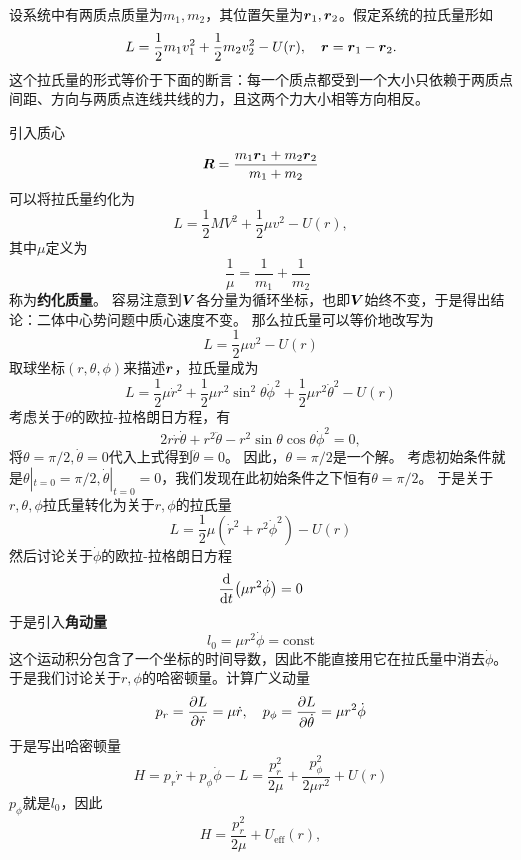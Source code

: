 \documentclass[UTF8, a4paper]{ctexart}
\newcommand*{\const}{\mathrm{const}}
\begin{document}
设系统中有两质点质量为$m_1,m_2$，其位置矢量为$\vb*{r}_1, \vb*{r}_2$。假定系统的拉氏量形如
\begin{equation}
    L = \frac{1}{2} m_1 v_1^2 + \frac{1}{2} m_2 v_2^2 - U(r), \quad \vb*{r} = \vb*{r}_1 - \vb*{r}_2.
    \label{eq:two-body-original}
\end{equation}
这个拉氏量的形式等价于下面的断言：每一个质点都受到一个大小只依赖于两质点间距、方向与两质点连线共线的力，且这两个力大小相等方向相反。

引入质心
\begin{equation}
    \vb*{R} = \frac{m_1 \vb*{r}_1 + m_2 \vb*{r}_2}{m_1 + m_2}
\end{equation}
可以将拉氏量约化为
\[
    L = \frac{1}{2} M V^2 + \frac{1}{2} \mu v^2 - U(r), 
\]
其中$\mu$定义为
\begin{equation}
    \quad \frac{1}{\mu} = \frac{1}{m_1} + \frac{1}{m_2}
\end{equation}
称为\textbf{约化质量}。
容易注意到$\vb*{V}$各分量为循环坐标，也即$\vb*{V}$始终不变，于是得出结论：二体中心势问题中质心速度不变。
那么拉氏量可以等价地改写为
\[
    L = \frac{1}{2} \mu v^2 - U(r)
\]
取球坐标$(r, \theta, \phi)$来描述$\vb*{r}$，拉氏量成为
\[
    L = \frac{1}{2} \mu \dot{r}^2 + \frac{1}{2} \mu r^2 \sin^2 \theta \dot{\phi}^2 + \frac{1}{2} \mu r^2 \dot{\theta}^2 - U(r)
\]
考虑关于$\theta$的欧拉-拉格朗日方程，有
\[
    2 r \dot{r} \dot{\theta} + r^2 \ddot{\theta} - r^2 \sin \theta \cos \theta \dot{\phi}^2 = 0,
\]
将$\theta=\pi/2, \dot{\theta}=0$代入上式得到$\ddot{\theta}=0$。
因此，$\theta=\pi/2$是一个解。
考虑初始条件就是$\theta|_{t=0}=\pi/2, \dot{\theta}|_{t=0}=0$，我们发现在此初始条件之下恒有$\theta=\pi/2$。
于是关于$r, \theta, \phi$拉氏量转化为关于$r, \phi$的拉氏量
\[
    L = \frac{1}{2} \mu (\dot{r}^2 + r^2 \dot{\phi}^2) - U(r)
\]
然后讨论关于$\dot{\phi}$的欧拉-拉格朗日方程
\[
    \dv{t} (\mu r^2 \dot{\phi}) = 0
\]
于是引入\textbf{角动量}
\begin{equation}
    l_0 = \mu r^2 \dot{\phi} = \const
\end{equation}
这个运动积分包含了一个坐标的时间导数，因此不能直接用它在拉氏量中消去$\dot{\phi}$。于是我们讨论关于$r, \phi$的哈密顿量。计算广义动量
\[
    p_r = \pdv{L}{\dot{r}} = \mu \dot{r}, \quad p_\phi = \pdv{L}{\dot{\theta}} = \mu r^2 \dot{\phi}
\]
于是写出哈密顿量
\[
    H = p_r \dot{r} + p_\phi \dot{\phi} - L = \frac{p_r^2}{2\mu} + \frac{p_\phi^2}{2\mu r^2} + U(r)
\]
$p_\phi$就是$l_0$，因此
\begin{equation}
    H = \frac{p_r^2}{2\mu} + U_\text{eff} (r),
    \label{eq:hamiltionian-about-r}
\end{equation}
\end{document}
